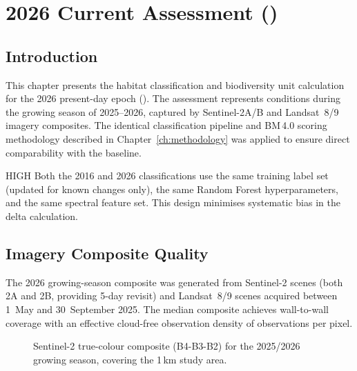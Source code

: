 \chapter{2026 Current Assessment (\Tone)}
\label{ch:current}

\section{Introduction}

This chapter presents the habitat classification and biodiversity unit calculation for the 2026 present-day epoch (\Tone). The assessment represents conditions during the growing season of 2025--2026, captured by Sentinel-2A/B and Landsat~8/9 imagery composites. The identical classification pipeline and BM\,4.0 scoring methodology described in Chapter~\ref{ch:methodology} was applied to ensure direct comparability with the \Tzero{} baseline.

\begin{confidencebox}{HIGH}
Both the 2016 and 2026 classifications use the same training label set (updated for known changes only), the same Random Forest hyperparameters, and the same spectral feature set. This design minimises systematic bias in the delta calculation.
\end{confidencebox}


\section{Imagery Composite Quality}

The 2026 growing-season composite was generated from  Sentinel-2 scenes (both 2A and 2B, providing 5-day revisit) and  Landsat~8/9 scenes acquired between 1~May and 30~September 2025. The median composite achieves wall-to-wall coverage with an effective cloud-free observation density of  observations per pixel.

\begin{figure}[H]
\centering
{}
\caption{Sentinel-2 true-colour composite (B4-B3-B2) for the 2025/2026 growing season, covering the 1\,km study area.}
\label{fig:composite-2026}
\end{figure}


